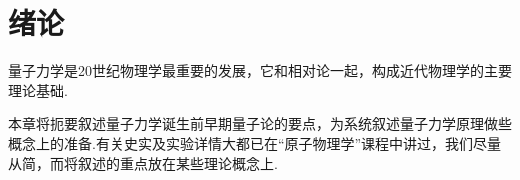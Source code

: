 \setcounter{chapter}{0}
\chapter{绪论}\label{chp:01}

量子力学是20世纪物理学最重要的发展，它和相对论一起，构成近代物理学的主要理论基础.

本章将扼要叙述量子力学诞生前早期量子论的要点，为系统叙述量子力学原理做些概念上的准备.有关史实及实验详情大都已在“原子物理学”课程中讲过，我们尽量从简，而将叙述的重点放在某些理论概念上.












